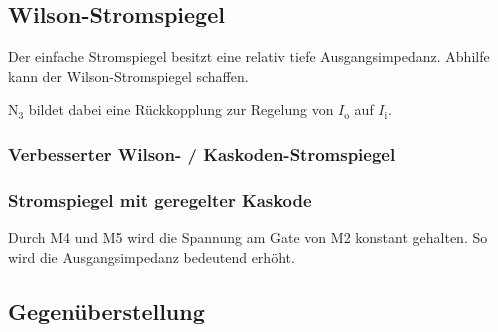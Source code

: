 



\subsection{Wilson-Stromspiegel}
Der einfache Stromspiegel besitzt eine relativ tiefe Ausgangsimpedanz.
Abhilfe kann der Wilson-Stromspiegel schaffen.

$\text{N}_3$ bildet dabei eine Rückkopplung zur Regelung von $I_\text{o}$ auf $I_\text{i}$.



\subsubsection{Verbesserter Wilson- / Kaskoden-Stromspiegel}



\subsubsection{Stromspiegel mit geregelter Kaskode}


Durch M4 und M5 wird die Spannung am Gate von M2 konstant gehalten. 
So wird die Ausgangsimpedanz bedeutend erhöht.


\subsection{Gegenüberstellung}


